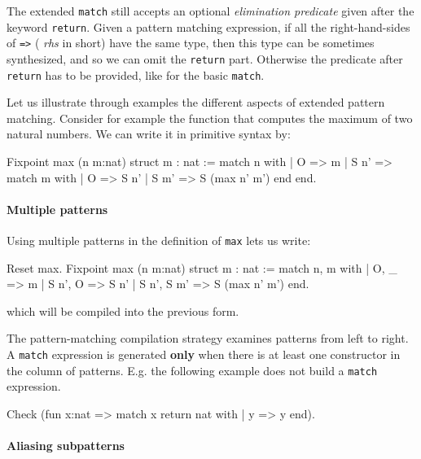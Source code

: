 The extended \texttt{match} still accepts an optional {\em elimination
predicate} given after the keyword \texttt{return}.  Given a pattern
matching expression, if all the right-hand-sides of \texttt{=>} ({\em
rhs} in short) have the same type, then this type can be sometimes
synthesized, and so we can omit the \texttt{return} part. Otherwise
the predicate after \texttt{return} has to be provided, like for the basic
\texttt{match}.

Let us illustrate through examples the different aspects of extended
pattern matching. Consider for example the function that computes the
maximum of two natural numbers. We can write it in primitive syntax
by:

\begin{coq_example}
Fixpoint max (n m:nat) {struct m} : nat :=
  match n with
  | O => m
  | S n' => match m with
            | O => S n'
            | S m' => S (max n' m')
            end
  end.
\end{coq_example}

\paragraph{Multiple patterns}

Using multiple patterns in the definition of {\tt max} lets us write:

\begin{coq_example}
Reset max.
Fixpoint max (n m:nat) {struct m} : nat :=
  match n, m with
  | O, _ => m
  | S n', O => S n'
  | S n', S m' => S (max n' m')
  end.
\end{coq_example}

which will be compiled into the previous form.

The pattern-matching compilation strategy examines patterns from left
to right. A \texttt{match} expression is generated {\bf only} when
there is at least one constructor in the column of patterns. E.g. the
following example does not build a \texttt{match} expression.

\begin{coq_example}
Check (fun x:nat => match x return nat with
                    | y => y
                    end).
\end{coq_example}

\paragraph{Aliasing subpatterns}

